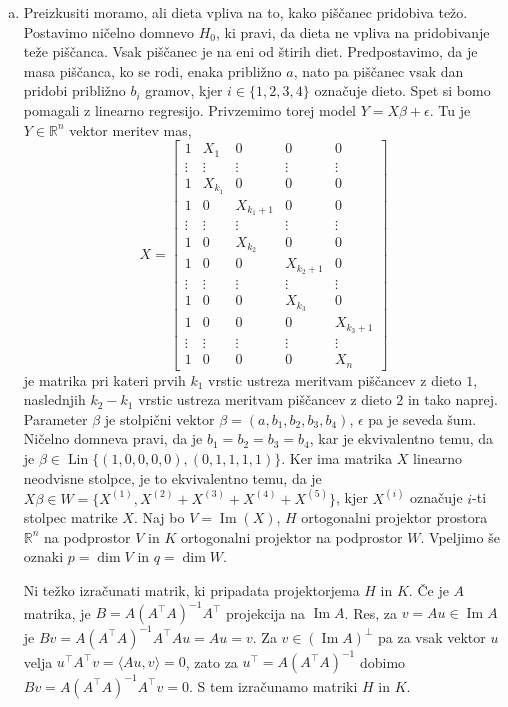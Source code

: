 \documentclass[a4paper,12pt]{article}
\def\R{\mathbb{R}}
\theoremstyle{definition}
\theoremstyle{plain}
\newcommand{\inner}[2]{\langle{#1},{#2}\rangle}
\DeclareMathOperator*{\Lin}{Lin}
\DeclareMathOperator*{\im}{Im}
\begin{document}
\begin{enumerate}[a)]
    \item Preizkusiti moramo, ali dieta vpliva na to, kako piščanec pridobiva težo. Postavimo ničelno domnevo $H_0$, ki pravi, da dieta ne vpliva na pridobivanje teže piščanca. Vsak piščanec je na eni od štirih diet. Predpostavimo, da je masa piščanca, ko se rodi, enaka približno $a$, nato pa piščanec vsak dan pridobi približno $b_i$ gramov, kjer $i \in \{1, 2, 3, 4\}$ označuje dieto. Spet si bomo pomagali z linearno regresijo. Privzemimo torej model $Y = X\beta + \epsilon$. Tu je $Y \in \R^n$ vektor meritev mas, 
    $$
    X = \left[
        \begin{array}{ccccc}
            1 & X_1 & 0 & 0 & 0 \\
            \vdots & \vdots & \vdots & \vdots & \vdots \\
            1 & X_{k_1} & 0 & 0 & 0 \\
            1 & 0 & X_{k_1 + 1} & 0 & 0 \\
            \vdots & \vdots & \vdots & \vdots & \vdots \\
            1 & 0 & X_{k_2} & 0 & 0 \\
            1 & 0 & 0 & X_{k_2 + 1} & 0 \\
            \vdots & \vdots & \vdots & \vdots & \vdots \\
            1 & 0 & 0 & X_{k_3} & 0 \\
            1 & 0 & 0 & 0 & X_{k_3 + 1} \\
            \vdots & \vdots & \vdots & \vdots & \vdots \\
            1 & 0 & 0 & 0 & X_{n}
        \end{array}
    \right]
    $$ 
    je matrika pri kateri prvih $k_1$ vrstic ustreza meritvam piščancev z dieto $1$, naslednjih $k_2 - k_1$ vrstic ustreza meritvam piščancev z dieto $2$ in tako naprej. Parameter $\beta$ je stolpični vektor $\beta = (a, b_1, b_2, b_3, b_4)$, $\epsilon$ pa je seveda šum. Ničelno domneva pravi, da je $b_1 = b_2 = b_3 = b_4$, kar je ekvivalentno temu, da je $\beta \in \Lin\{(1, 0, 0, 0, 0), (0, 1, 1, 1, 1)\}$. Ker ima matrika $X$ linearno neodvisne stolpce, je to ekvivalentno temu, da je $X\beta \in W = \{X^{(1)}, X^{(2)} + X^{(3)} + X^{(4)} + X^{(5)}\}$, kjer $X^{(i)}$ označuje $i$-ti stolpec matrike $X$. Naj bo $V = \im(X)$, $H$ ortogonalni projektor prostora $\R^n$ na podprostor $V$ in $K$ ortogonalni projektor na podprostor $W$. Vpeljimo še oznaki $p = \dim{V}$ in $q = \dim{W}$.

    Ni težko izračunati matrik, ki pripadata projektorjema $H$ in $K$. Če je $A$ matrika, je $B = A (A^\top A)^{-1} A^\top$ projekcija na $\im{A}$. Res, za $v = Au \in \im{A}$ je $Bv = A (A^\top A)^{-1} A^\top Au = Au = v$. Za $v \in (\im{A})^\bot$ pa za vsak vektor $u$ velja $u^\top A^\top v = \inner{Au}{v} = 0$, zato za $u^\top = A (A^\top A)^{-1}$ dobimo $Bv = A (A^\top A)^{-1} A^\top v = 0$. S tem izračunamo matriki $H$ in $K$.


\end{enumerate}
\end{document}
